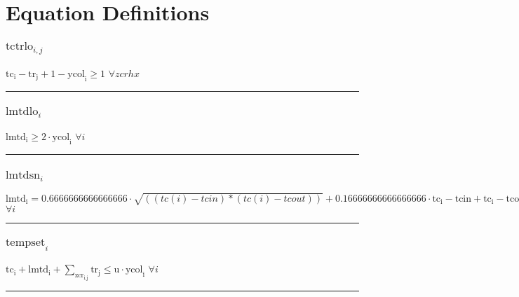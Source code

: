 \documentclass[11pt]{article}
\begin{document}
\section*{Equation Definitions}
\subsubsection*{\begin{math}\text{tctrlo}_{i,j}\end{math}}
\begin{math}
\text{tc}_{\text{i}} - \text{tr}_{\text{j}} + 1 - \text{ycol}_{\text{i}} \geq 1
\end{math}
\hfill
\begin{math}
\forall zcrhx
\end{math}\vspace{5pt}
\hrule
\subsubsection*{\begin{math}\text{lmtdlo}_{i}\end{math}}
\begin{math}
\text{lmtd}_{\text{i}} \geq 2 \cdot \text{ycol}_{\text{i}}
\end{math}
\hfill
\begin{math}
\forall i
\end{math}\vspace{5pt}
\hrule
\subsubsection*{\begin{math}\text{lmtdsn}_{i}\end{math}}
\begin{math}
\text{lmtd}_{\text{i}} = 0.6666666666666666 \cdot  \sqrt{((tc(i) - tcin) * (tc(i) - tcout))}  + 0.16666666666666666 \cdot \text{tc}_{\text{i}} - \text{tcin} + \text{tc}_{\text{i}} - \text{tcout} + \text{sl1}_{\text{i}} - \text{sl2}_{\text{i}}
\end{math}
\hfill
\begin{math}
\forall i
\end{math}\vspace{5pt}
\hrule
\subsubsection*{\begin{math}\text{tempset}_{i}\end{math}}
\begin{math}
\text{tc}_{\text{i}} + \text{lmtd}_{\text{i}} + \displaystyle \sum_{\text{zcr}_{\text{i},\text{j}}} \text{tr}_{\text{j}} \leq \text{u} \cdot \text{ycol}_{\text{i}}
\end{math}
\hfill
\begin{math}
\forall i
\end{math}\vspace{5pt}
\hrule
\end{document}
